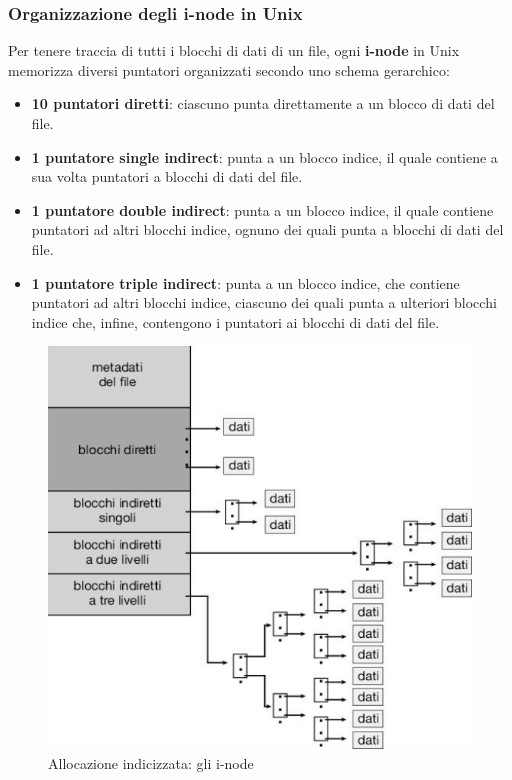\subsubsection{Organizzazione degli i-node in Unix}
Per tenere traccia di tutti i blocchi di dati di un file, ogni \textbf{i-node} in Unix memorizza diversi puntatori organizzati secondo uno schema gerarchico:
\begin{itemize}
    \item \textbf{10 puntatori diretti}: ciascuno punta direttamente a un blocco di dati del file.
    \item \textbf{1 puntatore single indirect}: punta a un blocco indice, il quale contiene a sua volta puntatori a blocchi di dati del file.
    \item \textbf{1 puntatore double indirect}: punta a un blocco indice, il quale contiene puntatori ad altri blocchi indice, ognuno dei quali punta a blocchi di dati del file.
    \item \textbf{1 puntatore triple indirect}: punta a un blocco indice, che contiene puntatori ad altri blocchi indice, ciascuno dei quali punta a ulteriori blocchi indice che, infine, contengono i puntatori ai blocchi di dati del file.
\end{itemize}



\begin{figure}[h] \centering \includegraphics[width=0.50\linewidth]{images/i_node_indicizzati.png} \caption{Allocazione indicizzata: gli i-node} \label{fig:14.8} \end{figure}

